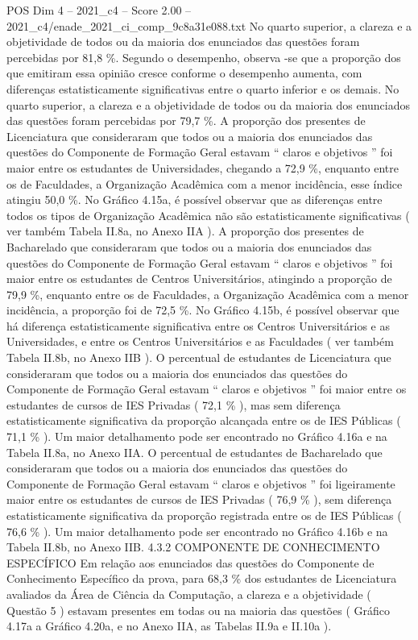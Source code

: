 \begin{textsample}{POS Dim 4 – 2021\_c4 – Score 2.00 – 2021\_c4/enade\_2021\_ci\_comp\_9c8a31e088.txt}
No quarto superior, a clareza e a objetividade de todos ou da maioria dos enunciados das questões foram percebidas por 81,8 \%.
Segundo o desempenho, observa -se que a proporção dos que emitiram essa opinião cresce conforme o desempenho aumenta, com diferenças estatisticamente significativas entre o quarto inferior e os demais.
No quarto superior, a clareza e a objetividade de todos ou da maioria dos enunciados das questões foram percebidas por 79,7 \%.
A proporção dos presentes de Licenciatura que consideraram que todos ou a maioria dos enunciados das questões do Componente de Formação Geral estavam “ claros e objetivos ” foi maior entre os estudantes de Universidades, chegando a 72,9 \%, enquanto entre os de Faculdades, a Organização Acadêmica com a menor incidência, esse índice atingiu 50,0 \%.
No Gráfico 4.15a, é possível observar que as diferenças entre todos os tipos de Organização Acadêmica não são estatisticamente significativas ( ver também Tabela II.8a, no Anexo IIA ).
A proporção dos presentes de Bacharelado que consideraram que todos ou a maioria dos enunciados das questões do Componente de Formação Geral estavam “ claros e objetivos ” foi maior entre os estudantes de Centros Universitários, atingindo a proporção de 79,9 \%, enquanto entre os de Faculdades, a Organização Acadêmica com a menor incidência, a proporção foi de 72,5 \%.
No Gráfico 4.15b, é possível observar que há diferença estatisticamente significativa entre os Centros Universitários e as Universidades, e entre os Centros Universitários e as Faculdades ( ver também Tabela II.8b, no Anexo IIB ).
O percentual de estudantes de Licenciatura que consideraram que todos ou a maioria dos enunciados das questões do Componente de Formação Geral estavam “ claros e objetivos ” foi maior entre os estudantes de cursos de IES Privadas ( 72,1 \% ), mas sem diferença estatisticamente significativa da proporção alcançada entre os de IES Públicas ( 71,1 \% ).
Um maior detalhamento pode ser encontrado no Gráfico 4.16a e na Tabela II.8a, no Anexo IIA.
O percentual de estudantes de Bacharelado que consideraram que todos ou a maioria dos enunciados das questões do Componente de Formação Geral estavam “ claros e objetivos ” foi ligeiramente maior entre os estudantes de cursos de IES Privadas ( 76,9 \% ), sem diferença estatisticamente significativa da proporção registrada entre os de IES Públicas ( 76,6 \% ).
Um maior detalhamento pode ser encontrado no Gráfico 4.16b e na Tabela II.8b, no Anexo IIB. 4.3.2 COMPONENTE DE CONHECIMENTO ESPECÍFICO Em relação aos enunciados das questões do Componente de Conhecimento Específico da prova, para 68,3 \% dos estudantes de Licenciatura avaliados da Área de Ciência da Computação, a clareza e a objetividade ( Questão 5 ) estavam presentes em todas ou na maioria das questões ( Gráfico 4.17a a Gráfico 4.20a, e no Anexo IIA, as Tabelas II.9a e II.10a ).

\end{textsample}
